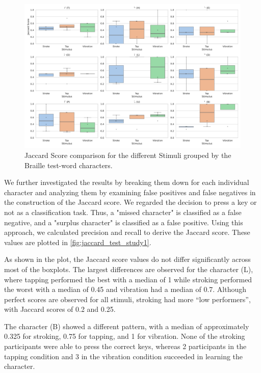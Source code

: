 \begin{figure}
    \centering
    \includegraphics[width=\linewidth]{src/pictures/Study1Data_Experiment/boxplot_with_swarm_single_chars_test.pdf}
    \caption{Jaccard Score comparison for the different Stimuli grouped by the Braille test-word characters.}
    \label{fig:jaccard_test_study1}
\end{figure}


We further investigated the results by breaking them down for each individual character and analyzing them by examining false positives and false negatives in the construction of the Jaccard score. 
We regarded the decision to press a key or not as a classification task. 
Thus, a "missed character" is classified as a false negative, and a "surplus character" is classified as a false positive. 
Using this approach, we calculated precision and recall to derive the Jaccard score. 
These values are plotted in \autoref{fig:jaccard_test_study1}. 

As shown in the plot, the Jaccard score values do not differ significantly across most of the boxplots. 
The largest differences are observed for the character (L), where tapping performed the best with a median of 1 while stroking performed the worst with a median of 0.45 and vibration had a median of 0.7. 
Although perfect scores are observed for all stimuli, stroking had more \enquote{low performers}, with Jaccard scores of 0.2 and 0.25.

The character (B) showed a different pattern, with a median of approximately 0.325 for stroking, 0.75 for tapping, and 1 for vibration. 
None of the stroking participants were able to press the correct keys, whereas 2 participants in the tapping condition and 3 in the vibration condition succeeded in learning the character.

